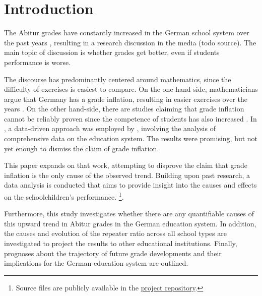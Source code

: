 \section{Introduction} \label{sec:Introduction}
The Abitur grades have constantly increased in the German school system over the past years \cite{kultusminister_konferenz_abiturnoten_nodate}, resulting in a research discussion in the media (todo source). The main topic of discussion is whether grades get better, even if students performance is worse.

The discourse has predominantly centered around mathematics, since the difficulty of exercises is easiest to compare. On the one hand-side, mathematicians argue that Germany has a grade inflation, resulting in easier exercises over the years \cite{kuhnel_modellierungskompetenz_2015, jahnke_hamburger_2014,lemmermeyer_zentralabitur_nodate}. On the other hand-side, there are studies claiming that grade inflation cannot be reliably proven since the competence of students has also increased \cite{schleithoff_noteninflation_2015}. In \citeyear{grozinger_gibt_2015}, a data-driven approach was employed by \citeauthor{grozinger_gibt_2015}, involving the analysis of comprehensive data on the education system. The results were promising, but not yet enough to dismiss the claim of grade inflation.

This paper expands on that work, attempting to disprove the claim that grade inflation is the only cause of the observed trend. Building upon past research, a data analysis is conducted that aims to provide insight into the causes and effects on the schoolchildren's performance. \footnote{Source files are publicly available in the \href{https://github.com/KarylReyne/DataLiteracyWS23}{project repository}.}.

Furthermore, this study investigates whether there are any quantifiable causes of this upward trend in Abitur grades in the German education system. In addition, the causes and evolution of the repeater ratio across all school types are investigated to project the results to other educational institutions. Finally, prognoses about the trajectory of future grade developments and their implications for the German education system are outlined.